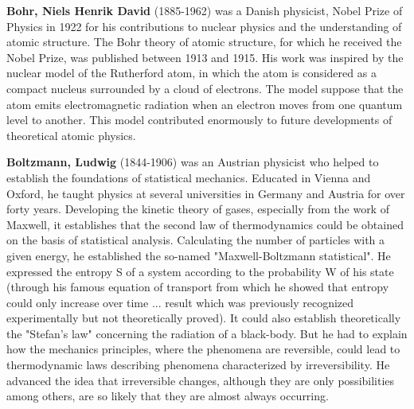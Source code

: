 \textbf{Bohr, Niels Henrik David} (1885-1962) was a Danish physicist, Nobel Prize of Physics in 1922 for his contributions to nuclear physics and the understanding of atomic structure. The Bohr theory of atomic structure, for which he received the Nobel Prize, was published between 1913 and 1915. His work was inspired by the nuclear model of the Rutherford atom, in which the atom is considered as a compact nucleus surrounded by a cloud of electrons. The model suppose that the atom emits electromagnetic radiation when an electron moves from one quantum level to another. This model contributed enormously to future developments of theoretical atomic physics.

\textbf{Boltzmann, Ludwig} (1844-1906) was an Austrian physicist who helped to establish the foundations of statistical mechanics. Educated in Vienna and Oxford, he taught physics at several universities in Germany and Austria for over forty years. Developing the kinetic theory of gases, especially from the work of Maxwell, it establishes that the second law of thermodynamics could be obtained on the basis of statistical analysis. Calculating the number of particles with a given energy, he established the so-named "Maxwell-Boltzmann statistical". He expressed the entropy S of a system according to the probability W of his state (through his famous equation of transport from which he showed that entropy could only increase over time ... result which was previously recognized experimentally but not theoretically proved). It could also establish theoretically the "Stefan's law" concerning the radiation of a black-body. But he had to explain how the mechanics principles, where the phenomena are reversible, could lead to thermodynamic laws describing phenomena characterized by irreversibility. He advanced the idea that irreversible changes, although they are only possibilities among others, are so likely that they are almost always occurring.

